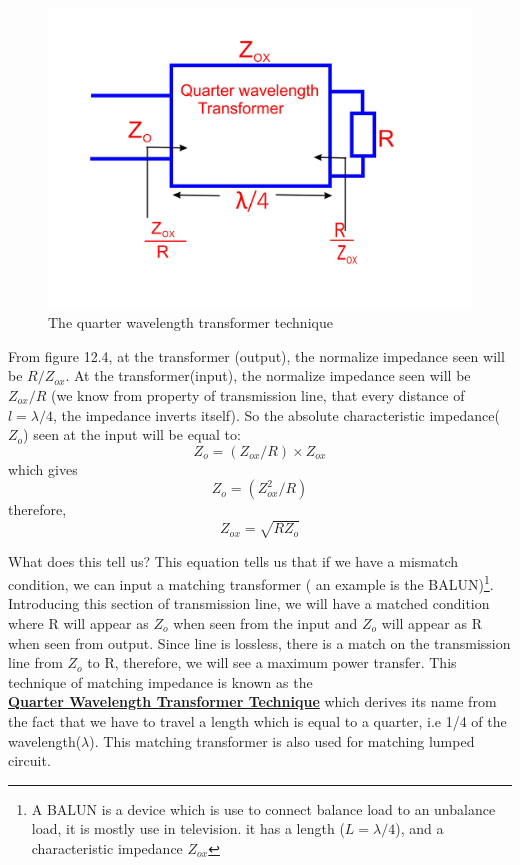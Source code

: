\begin{figure}[h]
\centering
\includegraphics[width=1\linewidth]{./graphics/fig9}
\caption{The quarter wavelength transformer technique}
\end{figure}
From figure 12.4, at the transformer (output), the normalize impedance seen will be $R/Z_{ox}$. At the transformer(input), the normalize impedance seen will be $Z_{ox}/R$ (we know from property of transmission line, that every distance of $l = \lambda/4$, the impedance inverts itself). So the absolute characteristic impedance($ Z_o$) seen at the input will be equal to: 
\[
Z_o=(Z_{ox}/R)\times Z_{ox}\]  which gives 
\[ Z_o=(Z_{ox}^2/R)\]
therefore, \begin{equation}
Z_{ox}=\sqrt{RZ_o}
\end{equation}

What does this tell us? This equation tells us that if we have a mismatch condition, we can input a matching transformer ( an example is the BALUN)\footnote{A BALUN is a device which is use to connect balance load to an unbalance load, it is mostly use in television.  it has a length ($L=\lambda/4$), and a characteristic impedance $Z_{ox} $}.
Introducing this section of transmission line, we will have a matched condition where R will appear as $ Z_o$ when seen from the input and $ Z_o$ will appear as R when seen from output. Since line is lossless, there is a match on the transmission line from $ Z_o$ to R, therefore, we will see a maximum power transfer.
This technique of matching impedance is known as the\\ 
\underline{\textbf{Quarter Wavelength Transformer Technique}} which derives its name from the fact that we have to travel a length which is equal to a quarter, i.e 1/4 of the wavelength($\lambda$). This matching transformer is also used for matching lumped circuit.\\
